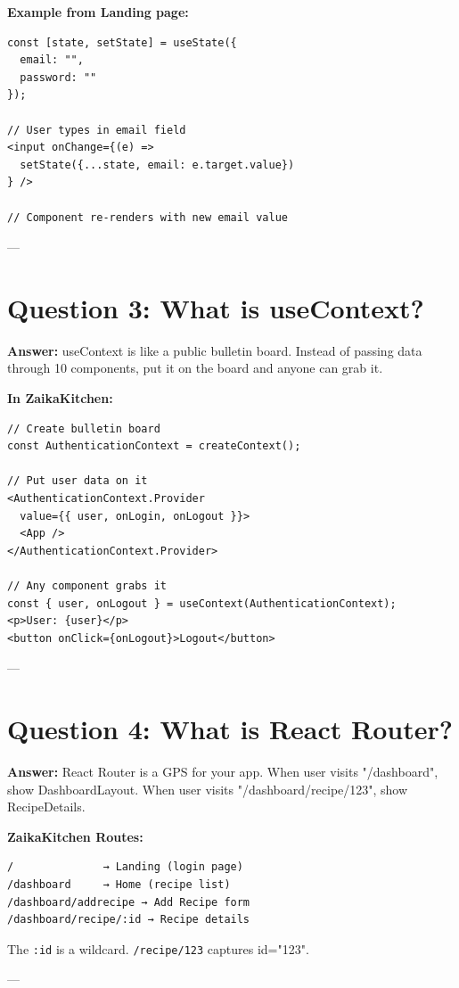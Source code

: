 \documentclass[11pt]{article}
\begin{document}
\textbf{Example from Landing page:}
\begin{lstlisting}
const [state, setState] = useState({ 
  email: "", 
  password: "" 
});

// User types in email field
<input onChange={(e) => 
  setState({...state, email: e.target.value})
} />

// Component re-renders with new email value
\end{lstlisting}

---

\section*{Question 3: What is useContext?}

\textbf{Answer:} useContext is like a public bulletin board. Instead of passing data through 10 components, put it on the board and anyone can grab it.

\textbf{In ZaikaKitchen:}
\begin{lstlisting}
// Create bulletin board
const AuthenticationContext = createContext();

// Put user data on it
<AuthenticationContext.Provider 
  value={{ user, onLogin, onLogout }}>
  <App />
</AuthenticationContext.Provider>

// Any component grabs it
const { user, onLogout } = useContext(AuthenticationContext);
<p>User: {user}</p>
<button onClick={onLogout}>Logout</button>
\end{lstlisting}

---

\section*{Question 4: What is React Router?}

\textbf{Answer:} React Router is a GPS for your app. When user visits "/dashboard", show DashboardLayout. When user visits "/dashboard/recipe/123", show RecipeDetails.

\textbf{ZaikaKitchen Routes:}
\begin{lstlisting}
/              → Landing (login page)
/dashboard     → Home (recipe list)
/dashboard/addrecipe → Add Recipe form
/dashboard/recipe/:id → Recipe details
\end{lstlisting}

The \texttt{:id} is a wildcard. \texttt{/recipe/123} captures id="123".

---
\end{document}
